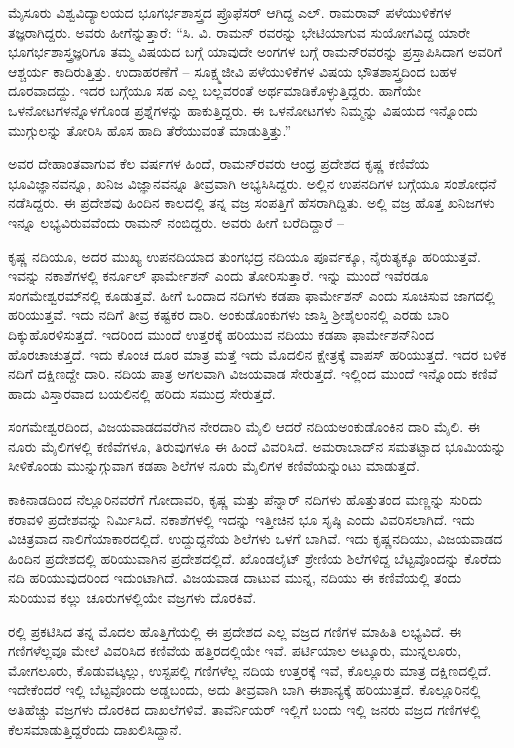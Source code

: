 ಮೈಸೂರು ವಿಶ್ವವಿದ್ಯಾಲಯದ ಭೂಗರ್ಭಶಾಸ್ತ್ರದ ಪ್ರೊಫೆಸರ್‍ ಆಗಿದ್ದ ಎಲ್‍. ರಾಮರಾವ್‍ ಪಳೆಯುಳಿಕೆಗಳ ತಜ್ಞರಾಗಿದ್ದರು. ಅವರು ಹೀಗೆನ್ನುತ್ತಾರೆ: “ಸಿ. ವಿ. ರಾಮನ್‍ ರವರನ್ನು ಭೇಟಿಯಾಗುವ ಸುಯೋಗವಿದ್ದ ಯಾರೇ ಭೂಗರ್ಭಶಾಸ್ತ್ರಜ್ಞರಿಗೂ ತಮ್ಮ ವಿಷಯದ ಬಗ್ಗೆ ಯಾವುದೇ ಅಂಗಗಳ ಬಗ್ಗೆ ರಾಮನ್‍ರವರನ್ನು ಪ್ರಸ್ತಾಪಿಸಿದಾಗ ಅವರಿಗೆ ಆಶ್ಚರ್ಯ ಕಾದಿರುತ್ತಿತ್ತು. ಉದಾಹರಣೆಗೆ – ಸೂಕ್ಷ್ಮಜೀವಿ ಪಳೆಯುಳಿಕೆಗಳ ವಿಷಯ ಭೌತಶಾಸ್ತ್ರದಿಂದ ಬಹಳ ದೂರವಾದದ್ದು. ಇದರ ಬಗ್ಗೆಯೂ ಸಹ ಎಲ್ಲ ಬಲ್ಲವರಂತೆ ಅರ್ಥಮಾಡಿಕೊಳ್ಳುತ್ತಿದ್ದರು. ಹಾಗೆಯೇ ಒಳನೋಟಗಳನ್ನೊಳಗೊಂಡ ಪ್ರಶ್ನೆಗಳನ್ನು ಹಾಕುತ್ತಿದ್ದರು. ಈ ಒಳನೋಟಗಳು ನಿಮ್ಮನ್ನು ವಿಷಯದ ಇನ್ನೊಂದು ಮುಗ್ಗುಲನ್ನು ತೋರಿಸಿ ಹೊಸ ಹಾದಿ ತೆರೆಯುವಂತೆ ಮಾಡುತ್ತಿತ್ತು.”

ಅವರ ದೇಹಾಂತವಾಗುವ ಕೆಲ ವರ್ಷಗಳ ಹಿಂದೆ, ರಾಮನ್‌ರವರು ಆಂಧ್ರ ಪ್ರದೇಶದ ಕೃಷ್ಣ ಕಣಿವೆಯ ಭೂವಿಜ್ಞಾನವನ್ನೂ, ಖನಿಜ ವಿಜ್ಞಾನವನ್ನೂ ತೀವ್ರವಾಗಿ ಅಭ್ಯಸಿಸಿದ್ದರು. ಅಲ್ಲಿನ ಉಪನದಿಗಳ ಬಗ್ಗೆಯೂ ಸಂಶೋಧನೆ ನಡೆಸಿದ್ದರು. ಈ ಪ್ರದೇಶವು ಹಿಂದಿನ ಕಾಲದಲ್ಲಿ ತನ್ನ ವಜ್ರ ಸಂಪತ್ತಿಗೆ ಹೆಸರಾಗಿದ್ದಿತು. ಅಲ್ಲಿ ವಜ್ರ ಹೊತ್ತ ಖನಿಜಗಳು ಇನ್ನೂ ಲಭ್ಯವಿರುವವೆಂದು ರಾಮನ್ ನಂಬಿದ್ದರು. ಅವರು ಹೀಗೆ ಬರೆದಿದ್ದಾರೆ –

ಕೃಷ್ಣ ನದಿಯೂ, ಅದರ ಮುಖ್ಯ ಉಪನದಿಯಾದ ತುಂಗಭದ್ರ ನದಿಯೂ ಪೂರ್ವಕ್ಕೂ, ನೈರುತ್ಯಕ್ಕೂ  ಹರಿಯುತ್ತವೆ. ಇವನ್ನು ನಕಾಶೆಗಳಲ್ಲಿ ಕರ್ನೂಲ್ ಫಾರ್ಮೇಶನ್ ಎಂದು ತೋರಿಸುತ್ತಾರೆ. ಇನ್ನು ಮುಂದೆ ಇವೆರಡೂ ಸಂಗಮೇಶ್ವರಮ್‍ನಲ್ಲಿ ಕೂಡುತ್ತವೆ. ಹೀಗೆ ಒಂದಾದ ನದಿಗಳು ಕಡಪಾ ಫಾರ್ಮೇಶನ್ ಎಂದು ಸೂಚಿಸುವ ಜಾಗದಲ್ಲಿ ಹರಿಯುತ್ತವೆ. ಇದು ನದಿಗೆ ತೀವ್ರ ಕಷ್ಟಕರ ದಾರಿ. ಅಂಕುಡೊಂಕುಗಳು ಜಾಸ್ತಿ ಶ‍್ರೀಶೈಲಂನಲ್ಲಿ ಎರಡು ಬಾರಿ ದಿಕ್ಕುಹೊರಳಿಸುತ್ತದೆ. ಇದರಿಂದ ಮುಂದೆ ಉತ್ತರಕ್ಕೆ ಹರಿಯುವ ನದಿಯು ಕಡಪಾ ಫಾರ್ಮೇಶನ್‌ನಿಂದ ಹೊರಚಾಚುತ್ತದೆ. ಇದು ಕೊಂಚ ದೂರ ಮಾತ್ರ ಮತ್ತೆ ಇದು ಮೊದಲಿನ ಕ್ಷೇತ್ರಕ್ಕೆ ವಾಪಸ್ ಹರಿಯುತ್ತದೆ. ಇದರ ಬಳಿಕ ನದಿಗೆ ದಕ್ಷಿಣದ್ದೇ ದಾರಿ. ನದಿಯ ಪಾತ್ರ ಅಗಲವಾಗಿ ವಿಜಯವಾಡ ಸೇರುತ್ತದೆ. ಇಲ್ಲಿಂದ ಮುಂದೆ ಇನ್ನೊಂದು ಕಣಿವೆ ಹಾದು ವಿಸ್ತಾರವಾದ ಬಯಲಿನಲ್ಲಿ ಹರಿದು ಸಮುದ್ರ ಸೇರುತ್ತದೆ.

ಸಂಗಮೇಶ್ವರದಿಂದ, ವಿಜಯವಾಡದವರೆಗಿನ ನೇರದಾರಿ  ಮೈಲಿ ಆದರೆ ನದಿಯ\break ಅಂಕುಡೊಂಕಿನ ದಾರಿ  ಮೈಲಿ. ಈ ನೂರು ಮೈಲಿಗಳಲ್ಲಿ ಕಣಿವೆಗಳೂ, ತಿರುವುಗಳೂ ಈ ಹಿಂದೆ ವಿವರಿಸಿದೆ. ಅಮರಾಬಾದ್‌ನ ಸಮತಟ್ಟಾದ ಭೂಮಿಯನ್ನು ಸೀಳಿಕೊಂಡು ಮುನ್ನುಗ್ಗುವಾಗ ಕಡಪಾ ಶಿಲೆಗಳ ನೂರು ಮೈಲಿಗಳ ಕಣಿವೆಯನ್ನುಂಟು ಮಾಡುತ್ತದೆ.

ಕಾಕಿನಾಡದಿಂದ ನೆಲ್ಲೂರಿನವರೆಗೆ ಗೋದಾವರಿ, ಕೃಷ್ಣ ಮತ್ತು ಪೆನ್ನಾರ್ ನದಿಗಳು ಹೊತ್ತುತಂದ ಮಣ್ಣನ್ನು ಸುರಿದು ಕರಾವಳಿ ಪ್ರದೇಶವನ್ನು ನಿರ್ಮಿಸಿದೆ. ನಕಾಶೆಗಳಲ್ಲಿ ಇದನ್ನು ಇತ್ತೀಚಿನ ಭೂ ಸೃಷ್ಠಿ ಎಂದು ವಿವರಿಸಲಾಗಿದೆ. ಇದು ವಿಚಿತ್ರವಾದ ನಾಲಿಗೆಯಾಕಾರದಲ್ಲಿದೆ. ಉದ್ದುದ್ದನೆಯ ಶಿಲೆಗಳು ಒಳಗೆ ಬಾಗಿವೆ. ಇದು ಕೃಷ್ಣನದಿಯು, ವಿಜಯವಾಡದ ಹಿಂದಿನ ಪ್ರದೇಶದಲ್ಲಿ ಹರಿಯುವಾಗಿನ ಪ್ರದೇಶದಲ್ಲಿದೆ. ಖೊಂಡಲೈಟ್ ಶ್ರೇಣಿಯ ಶಿಲೆಗಳಿದ್ದ ಬೆಟ್ಟವೊಂದನ್ನು ಕೊರೆದು ನದಿ ಹರಿಯುವುದ\-ರಿಂದ ಇದುಂಟಾಗಿದೆ. ವಿಜಯವಾಡ ದಾಟುವ ಮುನ್ನ, ನದಿಯು ಈ ಕಣಿವೆಯಲ್ಲಿ ತಂದು ಸುರಿಯುವ ಕಲ್ಲು ಚೂರುಗಳಲ್ಲಿಯೇ ವಜ್ರಗಳು ದೊರಕಿವೆ.

 ರಲ್ಲಿ  ಪ್ರಕಟಿಸಿದ ತನ್ನ ಮೊದಲ ಹೊತ್ತಿಗೆಯಲ್ಲಿ ಈ ಪ್ರದೇಶದ ಎಲ್ಲ ವಜ್ರದ ಗಣಿಗಳ ಮಾಹಿತಿ ಲಭ್ಯವಿದೆ. ಈ ಗಣಿಗಳೆಲ್ಲವೂ ಮೇಲೆ ವಿವರಿಸಿದ ಕಣಿವೆಯ ಹತ್ತಿರದಲ್ಲಿಯೇ ಇವೆ. ಪರ್ಟಿಯಾಲ ಅಟ್ಕೂರು, ಮುನ್ನಲೂರು, ಮೋಗಲೂರು, ಕೊಡುವಟ್ಕಲ್ಲು, ಉಸ್ಟಪಲ್ಲಿ ಗಣಿಗಳೆಲ್ಲ ನದಿಯ ಉತ್ತರಕ್ಕೆ ಇವೆ, ಕೊಲ್ಲೂರು ಮಾತ್ರ ದಕ್ಷಿಣದಲ್ಲಿದೆ. ಇದೇಕೆಂದರೆ ಇಲ್ಲಿ ಬೆಟ್ಟವೊಂದು ಅಡ್ಡಬಂದು, ಅದು ತೀವ್ರವಾಗಿ ಬಾಗಿ ಈಶಾನ್ಯಕ್ಕೆ ಹರಿಯುತ್ತದೆ. ಕೊಲ್ಲೂರಿನಲ್ಲಿ ಅತಿಹೆಚ್ಚು ವಜ್ರಗಳು ದೊರಕಿದ ದಾಖಲೆಗಳಿವೆ. ತಾವೆರ್ನಿಯರ್ ಇಲ್ಲಿಗೆ ಬಂದು ಇಲ್ಲಿ  ಜನರು ವಜ್ರದ ಗಣಿಗಳಲ್ಲಿ ಕೆಲಸಮಾಡುತ್ತಿದ್ದರೆಂದು ದಾಖಲಿಸಿದ್ದಾನೆ.

